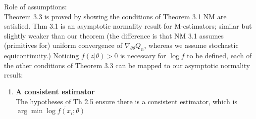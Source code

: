 \documentclass[11pt,letterpaper]{article}                  %
\newcommand*\diff{\mathop{}\!d} %
\begin{document}
\begin{problem}
%
%
%
%
%
%
%
%
Role of assumptions: \\

Theorem 3.3 is proved by showing the conditions of Theorem 3.1
NM are satisfied. Thm 3.1 is an asymptotic normality result for
M-estimators; similar but slightly weaker than our 
theorem (the difference is that NM 3.1 assumes (primitives for)
uniform convergence of $\nabla_{\theta\theta} Q_n$, whereas we assume
stochastic equicontinuity.) Noticing $f(z|\theta) > 0$ is necessary
for $\log f$ to be defined, each of the other conditions of Theorem 3.3
can be mapped to our asymptotic normality result:

\begin{enumerate}
\item \textbf{A consistent estimator} \\The hypotheses of Th 2.5
  ensure there is a consistent estimator, which is $\arg\min
  \overline{\log f(x_i; \theta)}$


\end{enumerate}
\end{problem}
\end{document}
